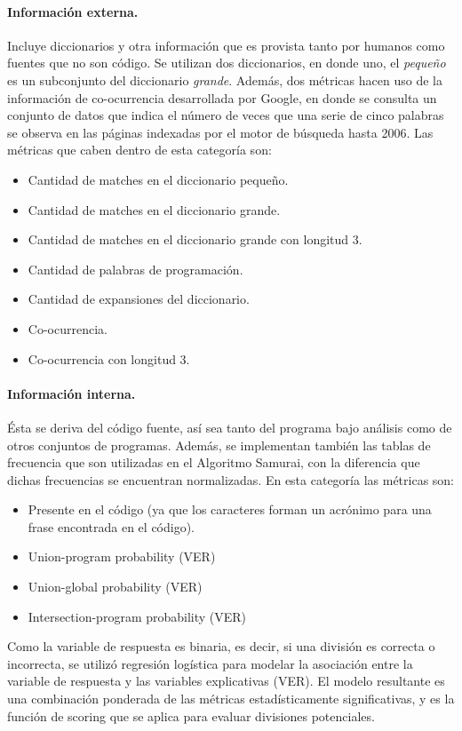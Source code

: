 \paragraph{Información externa.}
Incluye diccionarios y otra información que es provista tanto por humanos como fuentes que no son código.
Se utilizan dos diccionarios, en donde uno, el \textit{pequeño} es un subconjunto del diccionario \textit{grande}.
Además, dos métricas hacen uso de la información de co-ocurrencia desarrollada por Google, en donde se consulta un conjunto de datos que indica el número de veces que una serie de cinco palabras se observa en las páginas indexadas por el motor de búsqueda hasta 2006.
Las métricas que caben dentro de esta categoría son:
\begin{itemize}
  \item Cantidad de matches en el diccionario pequeño.
  \item Cantidad de matches en el diccionario grande.
  \item Cantidad de matches en el diccionario grande con longitud 3.
  \item Cantidad de palabras de programación.
  \item Cantidad de expansiones del diccionario.
  \item Co-ocurrencia.
  \item Co-ocurrencia con longitud 3.
\end{itemize}

\paragraph{Información interna.}
Ésta se deriva del código fuente, así sea tanto del programa bajo análisis como de otros conjuntos de programas.
Además, se implementan también las tablas de frecuencia que son utilizadas en el Algoritmo Samurai, con la diferencia que dichas frecuencias se encuentran normalizadas.
En esta categoría las métricas son:
\begin{itemize}
  \item Presente en el código (ya que los caracteres forman un acrónimo para una frase encontrada en el código).
  \item Union-program probability (VER)
  \item Union-global probability (VER)
  \item Intersection-program probability (VER)
\end{itemize}

Como la variable de respuesta es binaria, es decir, si una división es correcta o incorrecta, se utilizó regresión logística para modelar la asociación entre la variable de respuesta y las variables explicativas (VER).
El modelo resultante es una combinación ponderada de las métricas estadísticamente significativas, y es la función de scoring que se aplica para evaluar divisiones potenciales.

